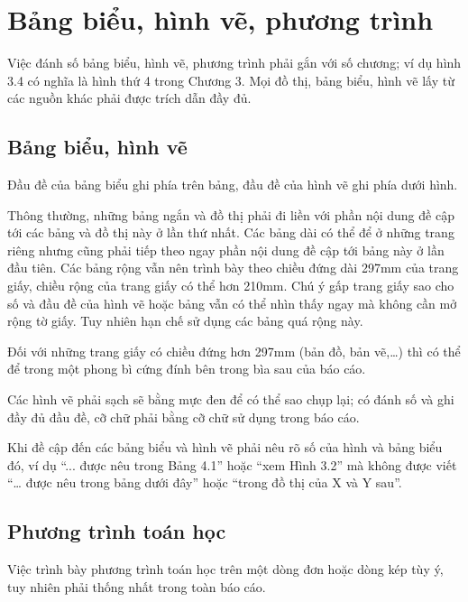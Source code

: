 \section{Bảng biểu, hình vẽ, phương trình}


Việc đánh số bảng biểu, hình vẽ, phương trình phải gắn với số chương; ví dụ hình 3.4 có nghĩa là hình thứ 4 trong Chương 3.
Mọi đồ thị, bảng biểu, hình vẽ lấy từ các nguồn khác phải được trích dẫn đầy đủ.

\subsection{Bảng biểu, hình vẽ}



Đầu đề của bảng biểu ghi phía trên bảng, đầu đề của hình vẽ ghi phía dưới hình.

Thông thường, những bảng ngắn và đồ thị phải đi liền với phần nội dung đề cập tới các bảng và đồ thị này ở lần thứ nhất.
Các bảng dài có thể để ở những trang riêng nhưng cũng phải tiếp theo ngay phần nội dung đề cập tới bảng này ở lần đầu tiên.
Các bảng rộng vẫn nên trình bày theo chiều đứng dài 297mm của trang giấy, chiều rộng của trang giấy có thể hơn 210mm.
Chú ý gấp trang giấy sao cho số và đầu đề của hình vẽ hoặc bảng vẫn có thể nhìn thấy ngay mà không cần mở rộng tờ giấy.
Tuy nhiên hạn chế sử dụng các bảng quá rộng này.

Đối với những trang giấy có chiều đứng hơn 297mm (bản đồ, bản vẽ,\ldots) thì có thể để trong một phong bì cứng đính bên trong bìa sau của báo cáo.

Các hình vẽ phải sạch sẽ bằng mực đen để có thể sao chụp lại; có đánh số và ghi đầy đủ đầu đề, cỡ chữ phải bằng cỡ chữ sử dụng trong báo cáo.

Khi đề cập đến các bảng biểu và hình vẽ phải nêu rõ số của hình và bảng biểu đó, ví dụ ``... được nêu trong Bảng 4.1'' hoặc ``xem Hình 3.2'' mà không được viết ``… được nêu trong bảng dưới đây'' hoặc ``trong đồ thị của X và Y sau''.

\subsection{Phương trình toán học}

Việc trình bày phương trình toán học trên một dòng đơn hoặc dòng kép tùy ý, tuy nhiên phải thống nhất trong toàn báo cáo.

